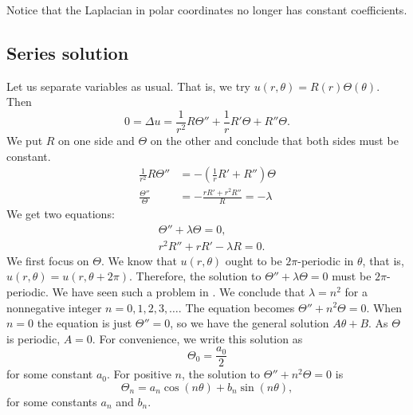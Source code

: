 Notice that the Laplacian in polar coordinates no longer has constant
coefficients.

\subsection{Series solution}

Let us separate variables as usual.  That is, we try
$u(r,\theta) = R(r)\Theta(\theta)$.  Then
\begin{equation*}
0 = \Delta u = 
\frac{1}{r^2} R \Theta''
+
\frac{1}{r} R' \Theta
+
R'' \Theta .
\end{equation*}
We put $R$ on one side and $\Theta$ on the other and conclude
that both sides must be constant.
\begin{align*}
\frac{1}{r^2} R \Theta''
& =
-
\left(\frac{1}{r} R' + R''\right) \Theta 
\\
\frac{\Theta''}{\Theta}
& =
-
\frac{r R' + r^2 R''}{R} = -\lambda
\end{align*}
We get two equations:
\begin{align*}
& \Theta'' + \lambda \Theta = 0 ,
\\
& r^2 R'' + r R' -\lambda R = 0.
\end{align*}
We first focus on $\Theta$.  We know that $u(r,\theta)$ ought to be
$2\pi$-periodic in $\theta$, that is,
$u(r,\theta) = u(r,\theta+2\pi)$.  Therefore, the solution to
$\Theta'' + \lambda \Theta = 0$ must be $2\pi$-periodic.
We have seen such a problem in .
We conclude
that
$\lambda = n^2$ for a
nonnegative integer $n=0,1,2,3,\ldots$.  The equation becomes
$\Theta'' + n^2 \Theta = 0$.  When $n=0$ the equation is just
$\Theta'' = 0$, so we have the general solution $A \theta + B$.  As
$\Theta$ is periodic,
$A=0$.
For convenience, we write this solution as
\begin{equation*}
\Theta_0 = \frac{a_0}{2}
\end{equation*}
for some constant $a_0$.  For positive $n$,
the 
solution to
$\Theta'' + n^2 \Theta = 0$ is
\begin{equation*}
\Theta_n = a_n \cos(n\theta) + b_n \sin(n\theta) ,
\end{equation*}
for some constants $a_n$ and $b_n$.

